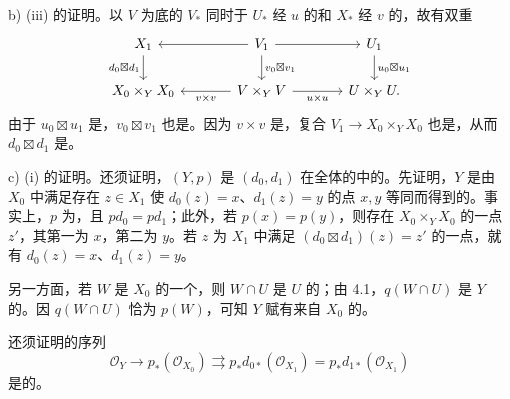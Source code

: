 b) (iii) 的证明。以 $V$ 为底的 $V_*$ 同时于 $U_*$ 经 $u$ 的和 $X_*$ 经 $v$ 的，故有双重
\[
\begin{tikzcd}[column sep=large]
X_1\arrow[d,"d_0\boxtimes d_1"']&V_1\arrow[l]\arrow[r]\arrow[d,"v_0\boxtimes v_1"]&U_1\arrow[d,"u_0\boxtimes u_1"]\\
X_0\times_YX_0&V\times_YV\arrow[l,"v\times v"]\arrow[r,"u\times u"']&U\times_YU.
\end{tikzcd}
\]
由于 $u_0\boxtimes u_1$ 是，$v_0\boxtimes v_1$ 也是。因为 $v\times v$ 是，复合 $V_1\to X_0\times_YX_0$ 也是，从而 $d_0\boxtimes d_1$ 是。

c) (i) 的证明。还须证明，$(Y,p)$ 是 $(d_0,d_1)$ 在全体的中的。先证明，$Y$ 是由 $X_0$ 中满足存在 $z\in X_1$ 使 $d_0(z)=x$、$d_1(z)=y$ 的点 $x,y$ 等同而得到的。事实上，$p$ 为，且 $pd_0=pd_1$；此外，若 $p(x)=p(y)$，则存在 $X_0\times_YX_0$ 的一点 $z'$，其第一为 $x$，第二为 $y$。若 $z$ 为 $X_1$ 中满足 $(d_0\boxtimes d_1)(z)=z'$ 的一点，就有 $d_0(z)=x$、$d_1(z)=y$。

另一方面，若 $W$ 是 $X_0$ 的一个，则 $W\cap U$ 是 $U$ 的；由 4.1，$q(W\cap U)$ 是 $Y$ 的。因 $q(W\cap U)$ 恰为 $p(W)$，可知 $Y$ 赋有来自 $X_0$ 的。

还须证明的序列
\[\mathcal O_Y\longrightarrow p_*(\mathcal O_{X_0})\rightrightarrows p_*d_{0*}(\mathcal O_{X_1})=p_*d_{1*}(\mathcal O_{X_1})\]
是的。

